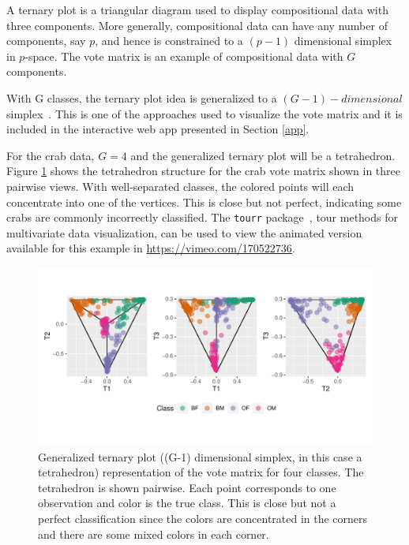 \documentclass[smallextended,natbib]{svjour3}\usepackage[]{graphicx}\usepackage[]{xcolor}
\makeatletter
\def\maxwidth{ %
  \ifdim\Gin@nat@width>\linewidth
    \linewidth
  \else
    \Gin@nat@width
  \fi
}
\newenvironment{knitrout}{}{} %
\makeatother
\begin{document}
A ternary plot is a triangular diagram used to display compositional data with three components. More generally, compositional data can have any number of components, say $p$, and hence is constrained to a $(p-1)$ dimensional simplex in $p$-space. The vote matrix is an example of compositional data with $G$ components.

With G classes, the ternary plot idea is generalized to a $(G-1)- dimensional$ simplex~\citep{sutherland2000orca, schloerke}. This is one of the approaches used to visualize the vote matrix and it is included in the interactive web app presented in Section \ref{app}.

For the crab data, $G=4$ and the generalized ternary plot will be a tetrahedron. Figure \ref{tetra} shows the tetrahedron structure for the crab vote matrix shown in three pairwise views. With well-separated classes, the colored points will each concentrate into one of the vertices. This is close but not perfect, indicating some crabs are commonly incorrectly classified. The \verb#tourr# package~\citep{wickham2011tourr}, tour methods for multivariate data visualization, can be used to view the animated version available for this example in  \url{https://vimeo.com/170522736}.


\begin{figure}[hbpt]
\centering
\begin{knitrout}
\color{fgcolor}
\includegraphics[width=\maxwidth]{ternary-1} 
\end{knitrout}
\caption{Generalized ternary plot ((G-1) dimensional simplex, in this case a tetrahedron) representation of the vote matrix for four classes. The tetrahedron is shown pairwise. Each point corresponds to one observation and color is the true class. This is close but not a perfect classification since the colors are concentrated in the corners and there are some mixed colors in each corner.}
\label{tetra}
\end{figure}
\end{document}
